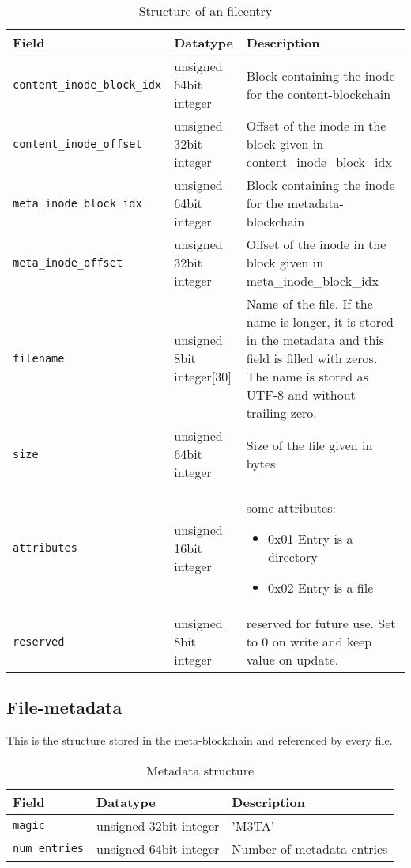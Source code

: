 \documentclass[a4paper,12pt]{article}
\begin{document}
			\begin{table}[ht]
				\caption{Structure of an fileentry}\label{tab:4}
				\begin{tabularx}{\linewidth}{|l|l|X|} \hline
					\textbf{Field}					& \textbf{Datatype}				& \textbf{Description} \\ \hline
					\verb|content_inode_block_idx|	& unsigned 64bit integer		& Block containing the inode for the content-blockchain \\ \hline
					\verb|content_inode_offset|		& unsigned 32bit integer		& Offset of the inode in the block given in content\_inode\_block\_idx \\ \hline
					\verb|meta_inode_block_idx|		& unsigned 64bit integer		& Block containing the inode for the metadata-blockchain \\ \hline
					\verb|meta_inode_offset|		& unsigned 32bit integer		& Offset of the inode in the block given in meta\_inode\_block\_idx \\ \hline
					\verb|filename|					& unsigned 8bit integer[30]		& Name of the file. If the name is longer, it is stored in the metadata and this field is filled with zeros. The name is stored as UTF-8 and without trailing zero. \\ \hline
					\verb|size|						& unsigned 64bit integer		& Size of the file given in bytes	\\ \hline
					\verb|attributes|				& unsigned 16bit integer		& some attributes:
						\begin{itemize}
							\item 0x01
							Entry is a directory
							\item 0x02
							Entry is a file
						\end{itemize} \\ \hline
					\verb|reserved|				& unsigned 8bit integer		& reserved for future use. Set to 0 on write and keep value on update. \\ \hline
				\end{tabularx}
			\end{table}		
			
		\subsection{File-metadata}
			This is the structure stored in the meta-blockchain and referenced by every file.
			
			\begin{table}[ht]
				\caption{Metadata structure}\label{tab:5}
				\begin{tabularx}{\linewidth}{|l|l|X|} \hline
					\textbf{Field}		& \textbf{Datatype}			& \textbf{Description}	\\ \hline
					\verb|magic|			& unsigned 32bit integer	& 'M3TA' \\ \hline
					\verb|num_entries|	& unsigned 64bit integer	& Number of metadata-entries \\ \hline
				\end{tabularx}
			\end{table}
		
\end{document}
